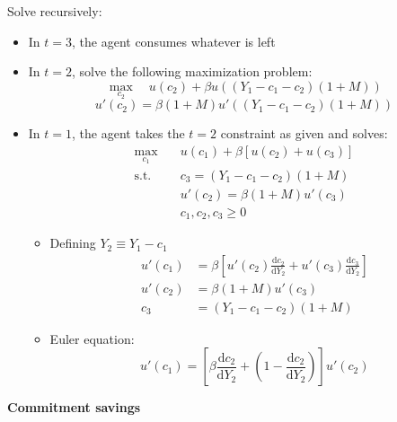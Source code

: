 \documentclass[a4paper]{article}
\begin{document}
Solve recursively:
\begin{itemize}
    \item In $t=3$, the agent consumes whatever is left
    \item In $t=2$, solve the following maximization problem:
    \[\max_{c_2}\quad u(c_2)+\beta u\left((Y_1-c_1-c_2)(1+M)\right) \]
    \[u'(c_2)=\beta(1+M)u'\left((Y_1-c_1-c_2)(1+M)\right) \]
    \item In $t=1$, the agent takes the $t=2$ constraint as given and solves:
    \begin{align*}
        \max_{c_1}\quad & u(c_1)+\beta[u(c_2)+u(c_3) ] \\
        \textrm{s.t.}\quad & c_3=(Y_1-c_1-c_2)(1+M) \\
        & u'(c_2)=\beta(1+M)u'(c_3) \\
        & c_1, c_2, c_3 \geq 0
    \end{align*}
    \begin{itemize}
        \item Defining $Y_2\equiv Y_1-c_1$
        \begin{align*}
            u'(c_1)&=\beta\left[u'(c_2)\frac{\textrm{d}c_2}{\textrm{d}Y_2}+
            u'(c_3)\frac{\textrm{d}c_3}{\textrm{d}Y_2} \right] \\
            u'(c_2)&=\beta(1+M)u'(c_3) \\
            c_3&=(Y_1-c_1-c_2)(1+M)
        \end{align*}
        \item Euler equation:
        \[u'(c_1)=\left[\beta\frac{\textrm{d}c_2}{\textrm{d}Y_2}+
        \left(1-\frac{\textrm{d}c_2}{\textrm{d}Y_2}\right) \right]u'(c_2) \]
    \end{itemize}
\end{itemize}

\textbf{Commitment savings}
\end{document}

